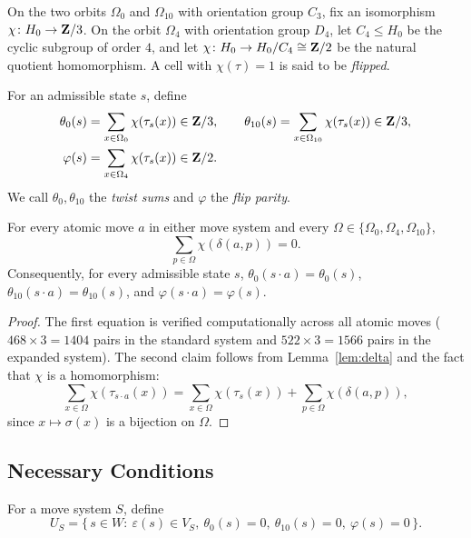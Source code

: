\documentclass[a4paper,11pt]{article}
\begin{document}
On the two orbits $\Omega_0$ and $\Omega_{10}$ with orientation group $C_3$, fix an isomorphism $\chi\colon H_0\to\mathbf{Z}/3$.
On the orbit $\Omega_4$ with orientation group $D_4$, let $C_4\le H_0$ be the cyclic subgroup of order $4$, and let $\chi\colon H_0\to H_0/C_4\cong\mathbf{Z}/2$ be the natural quotient homomorphism. A cell with $\chi(\tau)=1$ is said to be \emph{flipped}.

\begin{definition}
For an admissible state $s$, define
\begin{align*}
\theta_0(s)&=\sum_{x\in\Omega_0}\chi(\tau_s(x))\in\mathbf{Z}/3,\qquad
\theta_{10}(s)=\sum_{x\in\Omega_{10}}\chi(\tau_s(x))\in\mathbf{Z}/3,\\
\varphi(s)&=\sum_{x\in\Omega_4}\chi(\tau_s(x))\in\mathbf{Z}/2.
\end{align*}
We call $\theta_0,\theta_{10}$ the \emph{twist sums} and $\varphi$ the \emph{flip parity}.
\end{definition}

\begin{lemma}\label{lem:invariance}
For every atomic move $a$ in either move system and every $\Omega\in\{\Omega_0,\Omega_4,\Omega_{10}\}$,
\[
\sum_{p\in\Omega}\chi(\delta(a,p))=0.
\]
Consequently, for every admissible state $s$,
$\theta_0(s\cdot a)=\theta_0(s)$, $\theta_{10}(s\cdot a)=\theta_{10}(s)$, and $\varphi(s\cdot a)=\varphi(s)$.
\end{lemma}

\begin{proof}
The first equation is verified computationally across all atomic moves ($468\times3=1404$ pairs in the standard system and $522\times3=1566$ pairs in the expanded system).
The second claim follows from Lemma~\ref{lem:delta} and the fact that $\chi$ is a homomorphism:
\[
\sum_{x\in\Omega}\chi(\tau_{s\cdot a}(x))=\sum_{x\in\Omega}\chi(\tau_s(x))+\sum_{p\in\Omega}\chi(\delta(a,p)),
\]
since $x\mapsto\sigma(x)$ is a bijection on $\Omega$.
\end{proof}

\subsection{Necessary Conditions}

\begin{definition}
For a move system $S$, define
\[
U_S=\{\,s\in W:\ \varepsilon(s)\in V_S,\ \theta_0(s)=0,\ \theta_{10}(s)=0,\ \varphi(s)=0\,\}.
\]
\end{definition}
\end{document}
